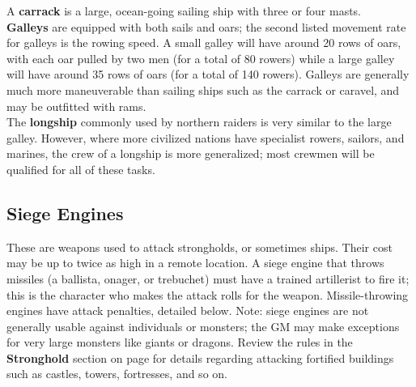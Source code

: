 \documentclass[a4paper,twoside,openany,10pt]{book}
\begin{document}
\begin{multicols}{2}
A \textbf{carrack} is a large, ocean-going sailing ship with three or four masts.\\

\textbf{Galleys} are equipped with both sails and oars; the second listed movement rate for galleys is the rowing speed. A small galley will have around 20 rows of oars, with each oar pulled by two men (for a total of 80 rowers) while a large galley will have around 35 rows of oars (for a total of 140 rowers). Galleys are generally much more maneuverable than sailing ships such as the carrack or caravel, and may be outfitted with rams.\\

The \textbf{longship} commonly used by northern raiders is very similar to the large galley. However, where more civilized nations have specialist rowers, sailors, and marines, the crew of a longship is more generalized; most crewmen will be qualified for all of these tasks.

\end{multicols}

\pagebreak

\subsection{Siege Engines}\label{siege-engines}

These are weapons used to attack strongholds, or sometimes ships. Their cost may be up to twice as high in a remote location. A siege engine that throws missiles (a ballista, onager, or trebuchet) must have a trained artillerist to fire it; this is the character who makes the attack rolls for the weapon. Missile-throwing engines have attack penalties, detailed below. Note: siege engines are not generally usable against individuals or monsters; the GM may make exceptions for very large monsters like giants or dragons. Review the rules in the \textbf{Stronghold} section on page \hyperlink{attacking-a-vehicle}{\pageref{attacking-a-vehicle}} for details regarding attacking fortified buildings such as castles, towers, fortresses, and so on.\\
\end{document}
